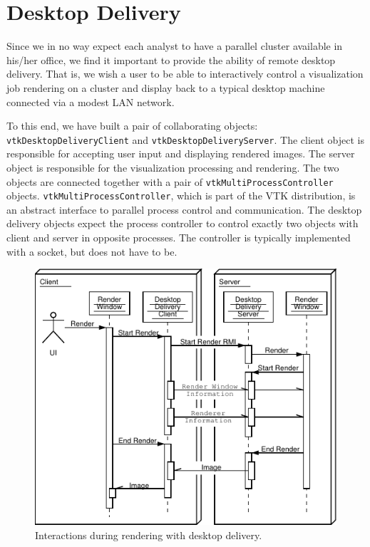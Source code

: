 \documentclass{acmsiggraph}
\newcommand{\cidentifier}[1]{\texttt{#1}}
\begin{document}
  \section{Desktop Delivery}
  \label{sec:desktop_delivery}

  Since we in no way expect each analyst to have a parallel cluster
  available in his/her office, we find it important to provide the ability
  of remote desktop delivery.  That is, we wish a user to be able to
  interactively control a visualization job rendering on a cluster and
  display back to a typical desktop machine connected via a modest LAN
  network.

  To this end, we have built a pair of collaborating objects:
  \cidentifier{vtk\-Desktop\-Delivery\-Client} and
  \cidentifier{vtk\-Desktop\-Delivery\-Server}.  The client object is
  responsible for accepting user input and displaying rendered images.  The
  server object is responsible for the visualization processing and
  rendering.  The two objects are connected together with a pair of
  \cidentifier{vtk\-Multi\-Process\-Controller} objects.
  \cidentifier{vtk\-Multi\-Process\-Controller}, which is part of the VTK
  distribution, is an abstract interface to parallel process control and
  communication.  The desktop delivery objects expect the process
  controller to control exactly two objects with client and server in
  opposite processes.  The controller is typically implemented with a
  socket, but does not have to be.

  \begin{figure}[ht]
    \begin{center}
      \includegraphics[width=\linewidth]{images/DesktopDeliveryInteraction}
      \caption{Interactions during rendering with desktop delivery.}
      \label{fig:desktop_delivery_interaction}
    \end{center}
  \end{figure}
\end{document}
